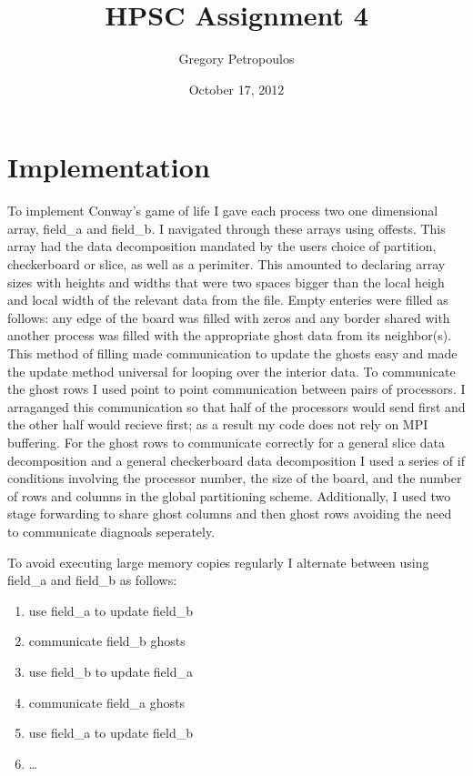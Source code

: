 \documentclass[11pt,a4paper,oneside]{report}
\begin{document}
\title{HPSC Assignment 4}
\author{Gregory Petropoulos}
\date{October 17, 2012}
\maketitle

\section{Implementation}
To implement Conway's game of life I gave each process two one dimensional array, field\_a and field\_b. 
I navigated through these arrays using offests.  
This array had the data decomposition mandated by the users choice of partition, checkerboard or slice, as well as a perimiter.  
This amounted to declaring array sizes with heights and widths that were two spaces bigger than the local heigh and local width of the relevant data from the file. 
Empty enteries were filled as follows:  any edge of the board was filled with zeros and any border shared with another process was filled with the appropriate ghost data from its neighbor(s).  
This method of filling made communication to update the ghosts easy and made the update method universal for looping over the interior data.  
To communicate the ghost rows I used point to point communication between pairs of processors.  
I arraganged this communication so that half of the processors would send first and the other half would recieve first; as a result my code does not rely on MPI buffering.
For the ghost rows to communicate correctly for a general slice data decomposition and a general checkerboard data decomposition I used a series of if conditions involving the processor number, the size of the board, and the number of rows and columns in the global partitioning scheme.  
Additionally, I used two stage forwarding to share ghost columns and then ghost rows avoiding the need to communicate diagnoals seperately.  

To avoid executing large memory copies regularly I alternate between using field\_a and field\_b as follows:

\begin{enumerate}
  \item use field\_a to update field\_b
  \item communicate field\_b ghosts
  \item use field\_b to update field\_a
  \item communicate field\_a ghosts
  \item use field\_a to update field\_b
  \item \dots
\end{enumerate}
\end{document}
